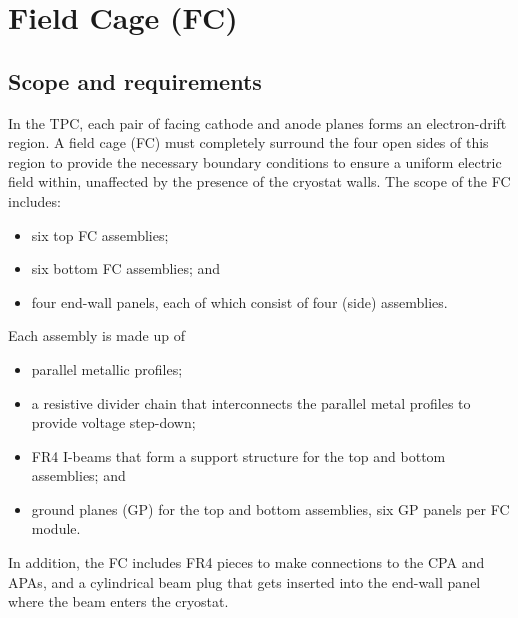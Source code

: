 



\section{Field Cage (FC)}
\label{detcompsec-fc}
\subsection{Scope and requirements} 

In the TPC, each pair of facing cathode and anode planes forms an electron-drift region. A field
cage (FC) must completely surround the four open sides of this region to provide the necessary boundary
conditions to ensure a uniform electric field within, unaffected by the presence of the cryostat walls.  The scope of the FC includes:

\begin{itemize}
\item six top FC assemblies;
\item six bottom FC assemblies; and
\item four end-wall panels, each of which consist of four (side) assemblies.
\end{itemize}

Each assembly is made up of
\begin{itemize}
\item parallel metallic profiles;
\item a resistive divider chain that interconnects the parallel metal profiles  to provide voltage step-down;
\item FR4 I-beams that form a support structure for the top and bottom assemblies; and
\item ground planes (GP) for the top and bottom assemblies, six GP panels per FC module.
\end{itemize}
In addition, the FC includes 
 FR4 pieces to make connections to the CPA and APAs, and a 
cylindrical beam plug that gets inserted into the end-wall panel where the beam enters the cryostat.

